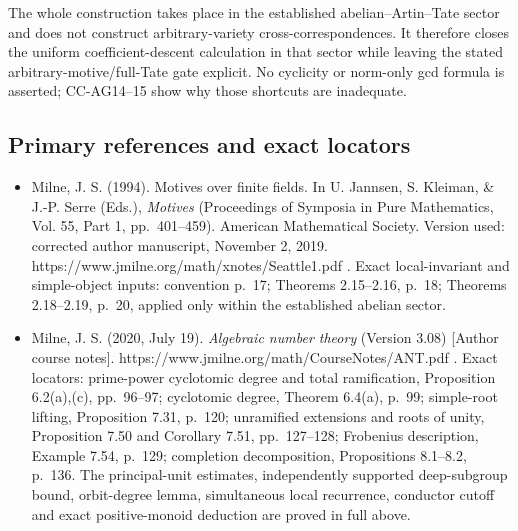 The whole construction takes place in the established
abelian--Artin--Tate sector and does not construct arbitrary-variety
cross-correspondences. It therefore closes the uniform
coefficient-descent calculation in that sector while leaving the stated
arbitrary-motive/full-Tate gate explicit. No cyclicity or norm-only gcd
formula is asserted; CC-AG14--15 show why those shortcuts are
inadequate.

\subsection{Primary references and exact
locators}\label{primary-references-and-exact-locators}

\begin{itemize}
\tightlist
\item
  Milne, J. S. (1994). Motives over finite fields. In U. Jannsen, S.
  Kleiman, \& J.-P. Serre (Eds.), \emph{Motives} (Proceedings of
  Symposia in Pure Mathematics, Vol. 55, Part 1, pp.~401--459). American
  Mathematical Society. Version used: corrected author manuscript,
  November 2, 2019. https://www.jmilne.org/math/xnotes/Seattle1.pdf .
  Exact local-invariant and simple-object inputs: convention p.~17;
  Theorems 2.15--2.16, p.~18; Theorems 2.18--2.19, p.~20, applied only
  within the established abelian sector.
\item
  Milne, J. S. (2020, July 19). \emph{Algebraic number theory} (Version
  3.08) {[}Author course notes{]}.
  https://www.jmilne.org/math/CourseNotes/ANT.pdf . Exact locators:
  prime-power cyclotomic degree and total ramification, Proposition
  6.2(a),(c), pp.~96--97; cyclotomic degree, Theorem 6.4(a), p.~99;
  simple-root lifting, Proposition 7.31, p.~120; unramified extensions
  and roots of unity, Proposition 7.50 and Corollary 7.51, pp.~127--128;
  Frobenius description, Example 7.54, p.~129; completion decomposition,
  Propositions 8.1--8.2, p.~136. The principal-unit estimates,
  independently supported deep-subgroup bound, orbit-degree lemma,
  simultaneous local recurrence, conductor cutoff and exact
  positive-monoid deduction are proved in full above.
\end{itemize}

